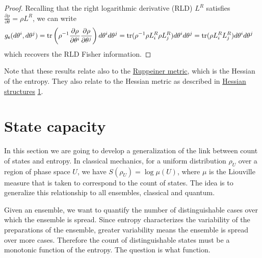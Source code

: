 \begin{mathSection}
\begin{proof}
	Recalling that the right logarithmic derivative (RLD) $L^R$ satisfies $\frac{\partial \rho}{\partial \theta} = \rho L^R$, we can write 
	\begin{equation}
		\begin{aligned}
			g_{\mathsf{e}}(d\theta^i, d\theta^j) &= \operatorname{tr}\left( \rho^{-1} \frac{\partial \rho}{\partial \theta^i }\frac{\partial \rho}{\partial \theta^j}\right) d\theta^i d\theta^j = \operatorname{tr}(\rho^{-1}\rho L^R
			_i \rho L^R_j)d\theta^i d\theta^j = \operatorname{tr}(\rho L^R
			_i L^R_j)d\theta^i d\theta^j
		\end{aligned}
	\end{equation}
	which recovers the RLD Fisher information.
\end{proof}

\begin{remark}
	Note that these results relate also to the \href{https://en.wikipedia.org/wiki/Ruppeiner_geometry}{Ruppeiner metric}, which is the Hessian of the entropy. They also relate to the Hessian metric as described in  \href{https://web.osu.cz/~Zusmanovich/seminar/2017/wolak/ostrava-11-17-hessian-pdf.pdf}{Hessian structures} \href{https://link.springer.com/chapter/10.1007/978-3-642-40020-9_4}{1}.
\end{remark}
\end{mathSection}

\section{State capacity}

In this section we are going to develop a generalization of the link between count of states and entropy. In classical mechanics, for a uniform distribution $\rho_U$ over a region of phase space $U$, we have $S(\rho_U) = \log \mu(U)$, where $\mu$ is the Liouville measure that is taken to correspond to the count of states. The idea is to generalize this relationship to all ensembles, classical and quantum.

Given an ensemble, we want to quantify the number of distinguishable cases over which the ensemble is spread. Since entropy characterizes the variability of the preparations of the ensemble, greater variability means the ensemble is spread over more cases. Therefore the count of distinguishable states must be a monotonic function of the entropy. The question is what function.


